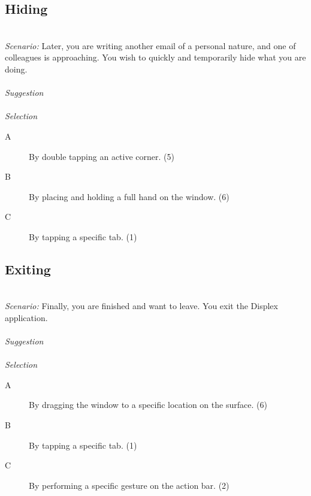 \subsection{Hiding}
\hfill\\
\emph{Scenario:}
Later, you are writing another email of a personal nature, and one of colleagues is approaching. You wish to quickly and temporarily hide what you are doing.
\\\\
\emph{Suggestion}
\\\\
\emph{Selection}
\begin{description}
\item[A]{By double tapping an active corner. (5)}
\item[B]{By placing and holding a full hand on the window. (6)}
\item[C]{By tapping a specific tab. (1)}
\end{description}


\subsection{Exiting}
\hfill\\
\emph{Scenario:}
Finally, you are finished and want to leave. You exit the Displex application.
\\\\
\emph{Suggestion}
\\\\
\emph{Selection}
\begin{description}
\item[A]{By dragging the window to a specific location on the surface. (6)}
\item[B]{By tapping a specific tab. (1)}
\item[C]{By performing a specific gesture on the action bar. (2)}
\end{description}

  
